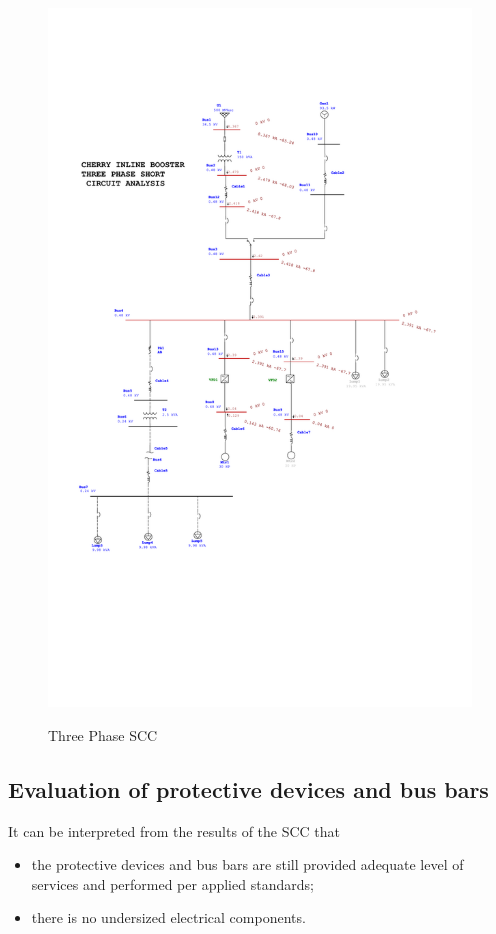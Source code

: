 \begin{figure}[!htb]
	
	\includegraphics[width=\textwidth]{figures/CHE_3PHSC_with_VFD.pdf} \\
	\caption{Three Phase SCC}
	\label{fig_ch04_elecaudit_scc_3phase} 
\end{figure}

\subsection{Evaluation of protective devices and bus bars}
It can be interpreted from the results of the SCC that 
\begin{itemize}
\item the protective devices and bus bars are still provided adequate level of services and performed per applied standards;

\item there is no undersized electrical components.
\end{itemize}





